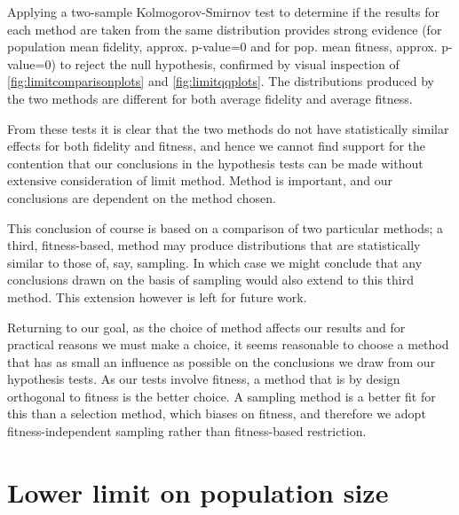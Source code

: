 


Applying a two-sample Kolmogorov-Smirnov test to determine if the results for each method are taken from the same distribution provides strong evidence (for population mean fidelity, approx. p-value=0 and for pop. mean fitness, approx. p-value=0) to reject the null hypothesis, confirmed by visual inspection of \cref{fig:limitcomparisonplots} and \cref{fig:limitqqplots}. The distributions produced by the two methods are different for both average fidelity and average fitness.

From these tests it is clear that the two methods do not have statistically similar effects for both fidelity and fitness, and hence we cannot find support for the contention that our conclusions in the hypothesis tests can be made without extensive consideration of limit method. Method is important, and our conclusions are dependent on the method chosen.

This conclusion of course is based on a comparison of two particular methods; a third, fitness-based, method may produce distributions that are statistically similar to those of, say, sampling. In which case we might conclude that any conclusions drawn on the basis of sampling would also extend to this third method. This extension however is left for future work.

Returning to our goal, as the choice of method affects our results and for practical reasons we must make a choice, it seems reasonable to choose a method that has as small an influence as possible on the conclusions we draw from our hypothesis tests. As our tests involve fitness, a method that is by design orthogonal to fitness is the better choice. A sampling method is a better fit for this than a selection method, which biases on fitness, and therefore we adopt fitness-independent sampling rather than fitness-based restriction.

\section[Lower size bound]{Lower limit on population size}\label{lower-size-limit}


